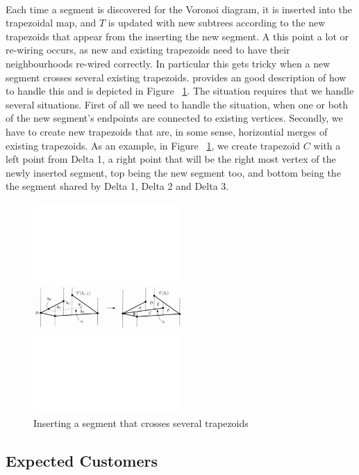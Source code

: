 \paragraph{}
Each time a segment is discovered for the Voronoi diagram, it is inserted into the trapezoidal map, and $T$ is updated with new subtrees according to the new trapezoids that appear from the inserting the new segment. A this point a lot or re-wiring occurs, as new and existing trapezoids need to have their neighbourhoods re-wired correctly. In particular this gets tricky when a new segment crosses several existing trapezoids. \cite{computational_geometry} provides an good description of how to handle this and is depicted in Figure ~\ref{fig:intersecting_segments}. The situation requires that we handle several situations. First of all we need to handle the situation, when one or both of the new segment's endpoints are connected to existing vertices. Secondly, we have to create new trapezoids that are, in some sense, horizontial merges of existing trapezoids. As an example, in  Figure ~\ref{fig:intersecting_segments}, we create  trapezoid $C$ with a left point from Delta 1, a right point that will be the right most vertex of the newly inserted segment, top being the new segment too, and bottom being the the segment shared by  Delta 1,  Delta 2 and  Delta 3.   

\begin{figure}[t]
    \centering
      \includegraphics[height=80mm]{images/intersecting_segments.pdf}
    \caption{Inserting a segment that crosses several trapezoids}
    \label{fig:intersecting_segments}
\end{figure}



\subsection{Expected Customers}

